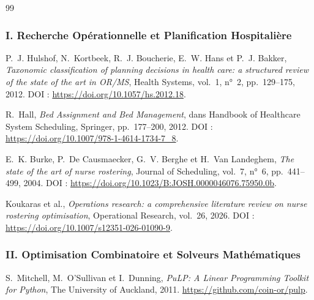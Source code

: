 \begin{thebibliography}{99}

\subsubsection*{I. Recherche Opérationnelle et Planification Hospitalière}

P.~J. Hulshof, N.~Kortbeek, R.~J. Boucherie, E.~W. Hans et P.~J. Bakker,
\newblock \emph{Taxonomic classification of planning decisions in health care: a structured review of the state of the art in OR/MS},
\newblock Health Systems, vol.~1, n°~2, pp.~129--175, 2012.
\newblock DOI : \url{https://doi.org/10.1057/hs.2012.18}.

R.~Hall,
\newblock \emph{Bed Assignment and Bed Management},
\newblock dans Handbook of Healthcare System Scheduling, Springer, pp.~177--200, 2012.
\newblock DOI : \url{https://doi.org/10.1007/978-1-4614-1734-7_8}.

E.~K. Burke, P.~De Causmaecker, G.~V. Berghe et H.~Van Landeghem,
\newblock \emph{The state of the art of nurse rostering},
\newblock Journal of Scheduling, vol.~7, n°~6, pp.~441--499, 2004.
\newblock DOI : \url{https://doi.org/10.1023/B:JOSH.0000046076.75950.0b}.

Koukaras et al.,
\newblock \emph{Operations research: a comprehensive literature review on nurse rostering optimisation},
\newblock Operational Research, vol.~26, 2026.
\newblock DOI : \url{https://doi.org/10.1007/s12351-026-01090-9}.

\subsubsection*{II. Optimisation Combinatoire et Solveurs Mathématiques}

S.~Mitchell, M.~O'Sullivan et I.~Dunning,
\newblock \emph{PuLP: A Linear Programming Toolkit for Python},
\newblock The University of Auckland, 2011.
\newblock \url{https://github.com/coin-or/pulp}.


\end{thebibliography}
